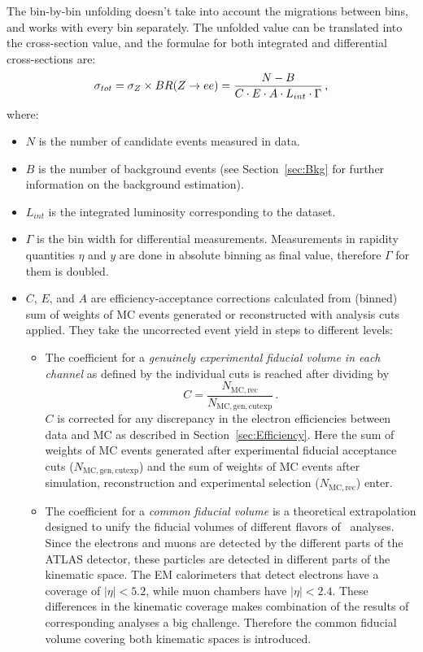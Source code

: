 The bin-by-bin unfolding doesn't take into account the migrations between bins, and works with every bin separately. The unfolded value can be translated into the cross-section value, and the formulae for both integrated and differential cross-sections are:
\begin{equation}
\sigma_{tot} = \sigma_{Z} \times BR(Z \rightarrow ee) = \frac{N - B}{C \cdot E \cdot A \cdot L_{int}  \cdot \Gamma}\,,
\end{equation}
where:
\begin{itemize}
\item {\bfseries $N$} is the number of candidate events measured in data.
\item {\bfseries $B$} is the number of background events (see Section~\ref{sec:Bkg} for further information on the background estimation).
\item {\bfseries $L_{int}$} is the integrated luminosity corresponding to the dataset.
\item {\bfseries $\Gamma$} is the bin width for differential measurements. Measurements in rapidity quantities $\eta$ and $y$ are done in absolute binning as final value, therefore $\Gamma$ for them is doubled.
\item $C$, $E$, and $A$ are efficiency-acceptance corrections calculated from (binned) sum of weights of MC events generated or reconstructed with analysis cuts applied. They take the uncorrected event yield in steps to different levels:
\begin{itemize}
\item The coefficient for a \textit{genuinely experimental fiducial volume in each channel} as defined by the individual cuts is reached after dividing by
\begin{equation}
  C = \frac{N_\mathrm{MC, rec}}{N_\mathrm{MC, gen, cutexp}}\,.
\end{equation}
$C$ is corrected for any discrepancy in the electron efficiencies between data and MC as described in Section~\ref{sec:Efficiency}. Here the sum of weights of MC events generated after experimental fiducial acceptance cuts ($N_\mathrm{MC, gen, cutexp}$) and the sum of weights of MC events after simulation, reconstruction and experimental selection ($N_\mathrm{MC, rec}$) enter.
\item The coefficient for a \textit{common fiducial volume} is a theoretical extrapolation designed to unify the fiducial volumes of different flavors of \Zll\ analyses. Since the electrons and muons are detected by the different parts of the ATLAS detector, these particles are detected in different parts of the kinematic space. The EM calorimeters that detect electrons have a coverage of $|\eta| < 5.2$, while muon chambers have $|\eta| < 2.4$. These differences in the kinematic coverage makes combination of the results of corresponding analyses a big challenge. Therefore the common fiducial volume covering both kinematic spaces is introduced.

\end{itemize}
\end{itemize}
